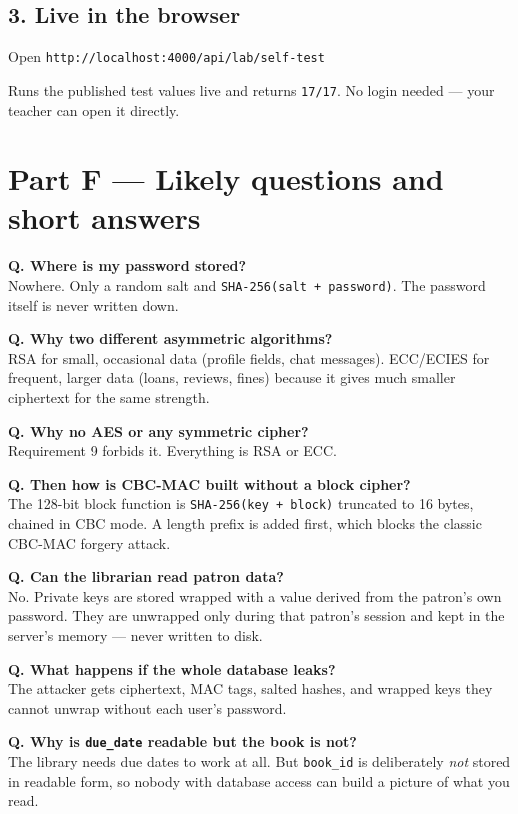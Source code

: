 \documentclass[11pt]{article}
\begin{document}
\subsection*{3. Live in the browser}

Open \texttt{http://localhost:4000/api/lab/self-test}

Runs the published test values live and returns \texttt{17/17}. No login
needed --- your teacher can open it directly.

\newpage
\section{Part F --- Likely questions and short answers}

\textbf{Q. Where is my password stored?} \\
Nowhere. Only a random salt and \texttt{SHA-256(salt + password)}. The password
itself is never written down.

\textbf{Q. Why two different asymmetric algorithms?} \\
RSA for small, occasional data (profile fields, chat messages). ECC/ECIES for
frequent, larger data (loans, reviews, fines) because it gives much smaller
ciphertext for the same strength.

\textbf{Q. Why no AES or any symmetric cipher?} \\
Requirement 9 forbids it. Everything is RSA or ECC.

\textbf{Q. Then how is CBC-MAC built without a block cipher?} \\
The 128-bit block function is \texttt{SHA-256(key + block)} truncated to 16
bytes, chained in CBC mode. A length prefix is added first, which blocks the
classic CBC-MAC forgery attack.

\textbf{Q. Can the librarian read patron data?} \\
No. Private keys are stored wrapped with a value derived from the patron's own
password. They are unwrapped only during that patron's session and kept in the
server's memory --- never written to disk.

\textbf{Q. What happens if the whole database leaks?} \\
The attacker gets ciphertext, MAC tags, salted hashes, and wrapped keys they
cannot unwrap without each user's password.

\textbf{Q. Why is \texttt{due\_date} readable but the book is not?} \\
The library needs due dates to work at all. But \texttt{book\_id} is
deliberately \emph{not} stored in readable form, so nobody with database access
can build a picture of what you read.
\end{document}
